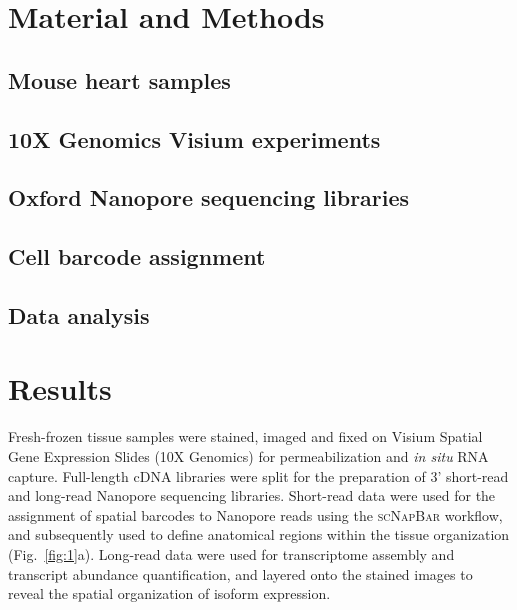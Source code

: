 \documentclass[utf8]{FrontiersinHarvard} %
\newcommand{\insi}{\textit{in situ}\xspace}
\newcommand{\scn}{\textsc{scNapBar}\xspace}
\begin{document}



\section*{Material and Methods}


\subsection*{Mouse heart samples}


\subsection*{10X Genomics Visium experiments}


\subsection*{Oxford Nanopore sequencing libraries}


\subsection*{Cell barcode assignment}


\subsection*{Data analysis}




\section*{Results}
Fresh-frozen tissue samples were stained, imaged and fixed on Visium Spatial Gene Expression Slides (10X Genomics) for permeabilization and \insi RNA capture.
Full-length cDNA libraries were split for the preparation of 3' short-read and long-read Nanopore sequencing libraries.
Short-read data were used for the assignment of spatial barcodes to Nanopore reads using the \scn workflow, and subsequently used to define anatomical regions within the tissue organization (Fig.~\ref{fig:1}a).
Long-read data were used for transcriptome assembly and transcript abundance quantification, and layered onto the stained images to reveal the spatial organization of isoform expression.
\end{document}
